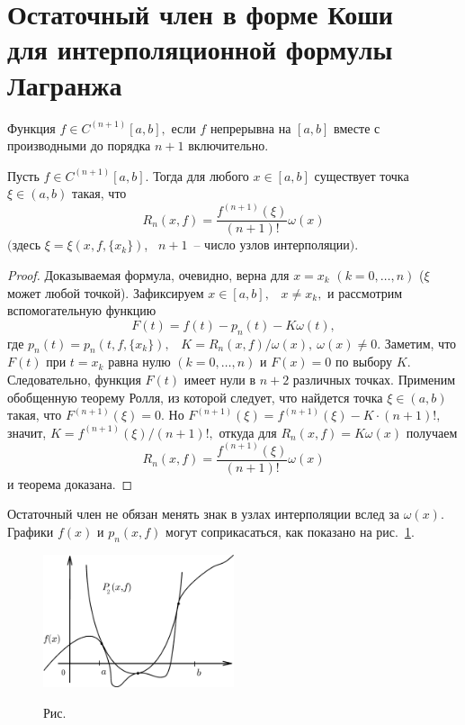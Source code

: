 \section{Остаточный член в форме Коши\\
 для интерполяционной формулы Лагранжа}

{Функция $f \in C^{(n+1)}[a,b],$ если $f$ непрерывна на $[a,b]$ вместе с производными
до} {порядка $n+1$ включительно.}

\begin{teo}\label{t1-1}
Пусть $f \in C^{(n+1)}[a,b].$ Тогда для любого $x \in [a,b]$ существует {точка} $\xi
\in (a,b)$ {такая}, что
\[
  R_n(x,f)=\frac{f^{(n+1)}(\xi)}{(n+1)!}\omega (x)
\]
$(${здесь $\xi=\xi(x,f,\{x_k\})$},~ $n+1$~-- число узлов
интерполяции$).$
\end{teo}

\begin{proof}
{Доказываемая формула, очевидно, верна для $x=x_k$}
{$(k=0,\dots ,n)$} ($\xi$ может любой точкой). Зафиксируем {$x \in [a,b],$~ $x \ne x_k,$}
и рассмотрим вспомогательную функцию
\[
  F(t)=f(t)-p_n(t)-K\omega (t),
\]
где {$p_n(t)=p_n(t,f,\{x_k\}),$~ $K=R_n(x,f)/ \omega (x), \ \omega(x) \ne 0.$} Заметим,
что $F(t)$ при $t=x_k$ равна нулю $(k=0,\dots ,n)$ и $F(x)=0$ по выбору $K.$ Следовательно, функция
{$F(t)$} имеет нули в ${n+2}$ различных точках. Применим обобщенную теорему Ролля, из
которой следует, что найдется точка $\xi \in (a,b)$ такая, что $F^{(n+1)}(\xi)=0$.
{Но} $F^{(n+1)}(\xi)=f^{(n+1)}(\xi)-K\cdot (n+1)!,$ значит,
$K=f^{(n+1)}(\xi)/(n+1)!,$ откуда {для} $R_n(x,f)=K\omega(x)$ {получаем}
\[
  R_n(x,f)=\frac{f^{(n+1)}(\xi)}{(n+1)!}\omega (x)
\]
и теорема доказана.
\end{proof}

\begin{Remark}[геометрическое]
{Остаточный} член не обязан менять знак в узлах {интерполяции вслед за
$\omega(x).$} Графики $f(x)$ и $p_n(x,f)$ могут соприкасаться, как показано на
рис.~\ref{r1-4}.
\end{Remark}


\begin{figure}[ht]
\begin{center}
\includegraphics[width=0.5\textwidth]{pict01-4.eps}
\end{center}
 \bigskip
 \label{r1-4}

 \centerline{Рис.~\theris}
 \bigskip
\end{figure}



